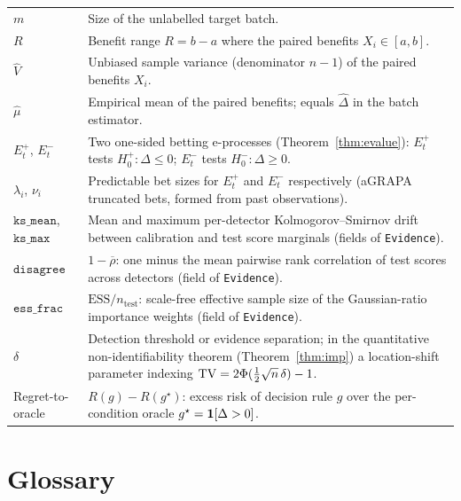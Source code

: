\begin{longtable}{lp{11cm}}
$m$ &
  Size of the unlabelled target batch. \\

$R$ &
  Benefit range $R = b - a$ where the paired benefits $X_i \in [a, b]$. \\

$\widehat{V}$ &
  Unbiased sample variance (denominator $n-1$) of the paired benefits $X_i$. \\

$\widehat\mu$ &
  Empirical mean of the paired benefits; equals $\widehat\Delta$ in the
  batch estimator. \\

$E_t^+$, $E_t^-$ &
  Two one-sided betting e-processes (Theorem~\ref{thm:evalue}):
  $E_t^+$ tests $H_0^+: \Delta \leq 0$; $E_t^-$ tests $H_0^-: \Delta \geq 0$. \\

$\lambda_i$, $\nu_i$ &
  Predictable bet sizes for $E_t^+$ and $E_t^-$ respectively (aGRAPA
  truncated bets, formed from past observations). \\

$\texttt{ks\_mean}$, $\texttt{ks\_max}$ &
  Mean and maximum per-detector Kolmogorov--Smirnov drift between calibration
  and test score marginals (fields of \texttt{Evidence}). \\

$\texttt{disagree}$ &
  $1 - \overline{\rho}$: one minus the mean pairwise rank correlation of
  test scores across detectors (field of \texttt{Evidence}). \\

$\texttt{ess\_frac}$ &
  $\mathrm{ESS}/n_\mathrm{test}$: scale-free effective sample size of
  the Gaussian-ratio importance weights (field of \texttt{Evidence}). \\

$\delta$ &
  Detection threshold or evidence separation; in the quantitative
  non-identifiability theorem (Theorem~\ref{thm:imp}) a location-shift
  parameter indexing $\mathrm{TV} = 2\Phi(\tfrac{1}{2}\sqrt{n}\,\delta) - 1$. \\

Regret-to-oracle &
  $R(g) - R(g^\star)$: excess risk of decision rule $g$ over the
  per-condition oracle $g^\star = \mathbf{1}[\Delta > 0]$. \\

\end{longtable}

\section{Glossary}
\label{sec:app-notation-glossary}

